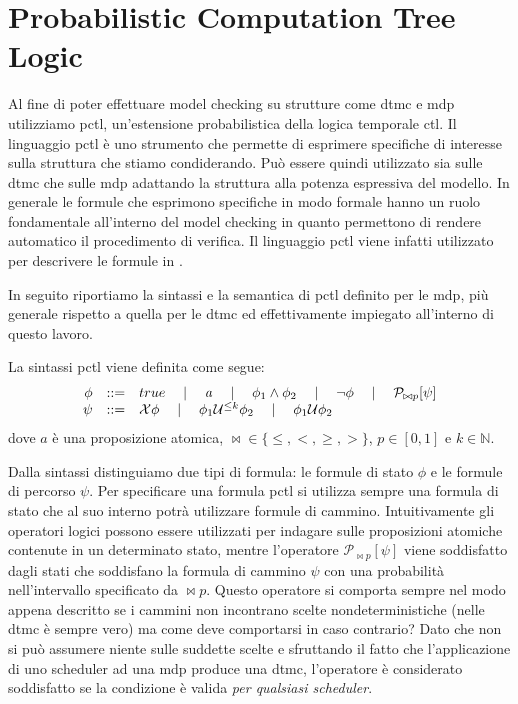 \section{Probabilistic Computation Tree Logic}
Al fine di poter effettuare model checking su strutture come \ac{dtmc} e \ac{mdp} utilizziamo \ac{pctl}, un'estensione probabilistica della logica temporale \ac{ctl}. Il linguaggio \ac{pctl} è uno strumento che permette di esprimere specifiche di interesse sulla struttura che stiamo condiderando. Può essere quindi utilizzato sia sulle \ac{dtmc} che sulle \ac{mdp} adattando la struttura alla potenza espressiva del modello. In generale le formule che esprimono specifiche in modo formale hanno un ruolo fondamentale all'interno del model checking in quanto permettono di rendere automatico il procedimento di verifica. Il linguaggio \ac{pctl} viene infatti utilizzato per descrivere le formule in \prism{}.

In seguito riportiamo la sintassi e la semantica di \ac{pctl} definito per le \ac{mdp}, più generale rispetto a quella per le \ac{dtmc} ed effettivamente impiegato all'interno di questo lavoro.

\begin{mtdef}
	La sintassi \ac{pctl} viene definita come segue:
$$
\begin{array}{rcl}
	\phi &::=& true \quad\mid\quad \mathit{a} \quad\mid\quad \phi_1 \wedge \phi_2 \quad\mid\quad \neg\phi \quad\mid\quad \mathcal{P}_{\bowtie p}[\psi] \\
	\psi &::=& \mathcal{X}\phi \quad\mid\quad \phi_1 \mathcal{U}^{\leq k} \phi_2 \quad\mid\quad \phi_1 \mathcal{U} \phi_2 \\
\end{array}
$$
dove $\mathit{a}$ è una proposizione atomica, $\bowtie \in \{\leq,<,\geq,>\}$, $p \in[0,1]$ e $k \in \mathbb{N}$.
\end{mtdef}
Dalla sintassi distinguiamo due tipi di formula: le formule di stato $\phi$ e le formule di percorso $\psi$. Per specificare una formula \ac{pctl} si utilizza sempre una formula di stato che al suo interno potrà utilizzare formule di cammino. Intuitivamente gli operatori logici possono essere utilizzati per indagare sulle proposizioni atomiche contenute in un determinato stato, mentre l'operatore $\mathcal{P}_{\bowtie p}[\psi]$ viene soddisfatto dagli stati che soddisfano la formula di cammino $\psi$ con una probabilità nell'intervallo specificato da $\bowtie p$. Questo operatore si comporta sempre nel modo appena descritto se i cammini non incontrano scelte nondeterministiche (nelle \ac{dtmc} è sempre vero) ma come deve comportarsi in caso contrario? Dato che non si può assumere niente sulle suddette scelte e sfruttando il fatto che l'applicazione di uno scheduler ad una \ac{mdp} produce una \ac{dtmc}, l'operatore è considerato soddisfatto se la condizione è valida \emph{per qualsiasi scheduler}.

